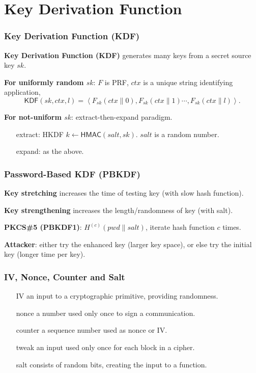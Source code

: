\section{Key Derivation Function}
\begin{frame}\frametitle{Key Derivation Function (KDF)}
\textbf{Key Derivation Function (KDF)} generates many keys from a secret source key $sk$.
\newline

\textbf{For uniformly random $sk$}: $F$ is PRF, $ctx$ is a unique string identifying application,
\[\mathsf{KDF}(sk,ctx,l) = \left<F_{sk}(ctx\|0),F_{sk}(ctx\|1)\cdots,F_{sk}(ctx\|l)\right>.\]

\textbf{For not-uniform $sk$}: extract-then-expand paradigm.\\
\begin{itemize}
\item[extract:] HKDF $k \gets \mathsf{HMAC}(salt,sk)$. $salt$ is a random number.
\item[expand:] as the above.
\end{itemize}
\end{frame}
\begin{frame}\frametitle{ Password-Based KDF (PBKDF)}
\textbf{Key stretching} increases the time of testing key (with slow hash function).
\newline

\textbf{Key strengthening} increases the length/randomness of key (with salt).
\newline

\textbf{PKCS\#5 (PBKDF1)}: $H^{(c)}(pwd\|salt)$, iterate hash function $c$ times.
\newline

\textbf{Attacker}: either try the enhanced key (larger key space), or else try the initial key (longer time per key).
\end{frame}
\begin{frame}\frametitle{IV, Nonce, Counter and Salt}
\begin{itemize}
\item[IV] an input to a cryptographic primitive, providing randomness. 
\item[nonce] a number used only once to sign a communication.
\item[counter] a sequence number used as nonce or IV.
\item[tweak] an input used only once for each block in a cipher.
\item[salt] consists of random bits, creating the input to a function. 
\end{itemize}
\end{frame}
